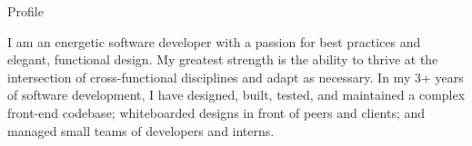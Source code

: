 \documentclass[]{mcdowellcv}
\begin{document}
	\makeheader

	\begin{cvsection}{Profile}
		\vspace{2pt}
		\begin{cvsubsection}{}{}{}
			I am an energetic software developer with a passion for best practices and elegant, functional design. 
			My greatest strength is the ability to thrive at the intersection of cross-functional disciplines and adapt as necessary.
			In my 3+ years of software development, I have designed, built, tested, and maintained a complex front-end codebase;
			whiteboarded designs in front of peers and clients; and managed small teams of developers and interns.
		\end{cvsubsection}
	\end{cvsection}
	
\end{document}
